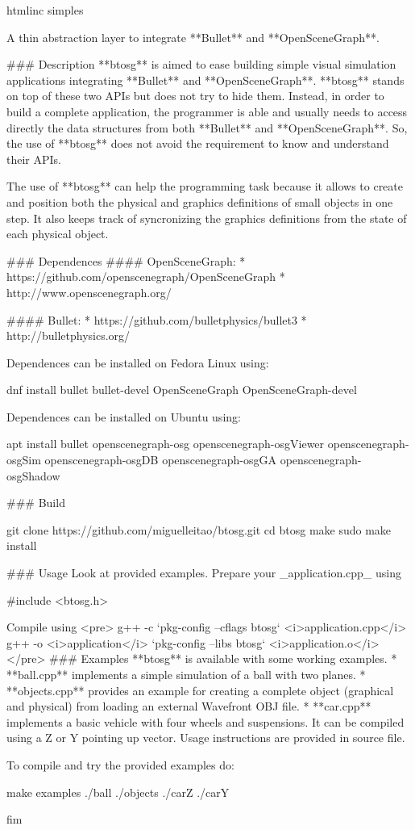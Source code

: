 htmlinc  simples 
\begin{DoxyCodeInclude}

A thin abstraction layer to integrate **Bullet** and **OpenSceneGraph**.

### Description 
**btosg** is aimed to ease building simple visual simulation applications integrating **Bullet** and
       **OpenSceneGraph**.
**btosg** stands on top of these two APIs but does not try to hide them. 
Instead, in order to build a complete application, the programmer is able and usually needs to access
       directly the data structures from both **Bullet** and **OpenSceneGraph**. So, the use of **btosg** does not avoid
       the requirement to know and understand their APIs.

The use of **btosg** can help the programming task because it allows to create and position both the
       physical and graphics definitions of small objects in one step. It also keeps track of syncronizing the graphics
       definitions from the state of each physical object.

### Dependences
#### OpenSceneGraph: 
* https://github.com/openscenegraph/OpenSceneGraph 
* http://www.openscenegraph.org/

#### Bullet:
* https://github.com/bulletphysics/bullet3 
* http://bulletphysics.org/

Dependences can be installed on Fedora Linux using:

    dnf install bullet bullet-devel OpenSceneGraph OpenSceneGraph-devel

Dependences can be installed on Ubuntu using:

    apt install bullet openscenegraph-osg openscenegraph-osgViewer openscenegraph-osgSim
       openscenegraph-osgDB openscenegraph-osgGA openscenegraph-osgShadow

### Build

    git clone https://github.com/miguelleitao/btosg.git
    cd btosg
    make
    sudo make install

### Usage
Look at provided examples. Prepare your \_application.cpp\_ using

    #include <btosg.h>

Compile using
<pre>
g++ -c `pkg-config --cflags btosg` <i>application.cpp</i>
g++ -o <i>application</i> `pkg-config --libs btosg` <i>application.o</i>
</pre>
### Examples
**btosg** is available with some working examples.
* **ball.cpp** implements a simple simulation of a ball with two planes.
* **objects.cpp** provides an example for creating a complete object (graphical and physical) from loading
       an external Wavefront OBJ file. 
* **car.cpp** implements a basic vehicle with four wheels and suspensions. It can be compiled using a Z or
       Y pointing up vector.
Usage instructions are provided in source file.

To compile and try the provided examples do:

    make examples 
    ./ball
    ./objects
    ./carZ
    ./carY

\end{DoxyCodeInclude}
 fim 